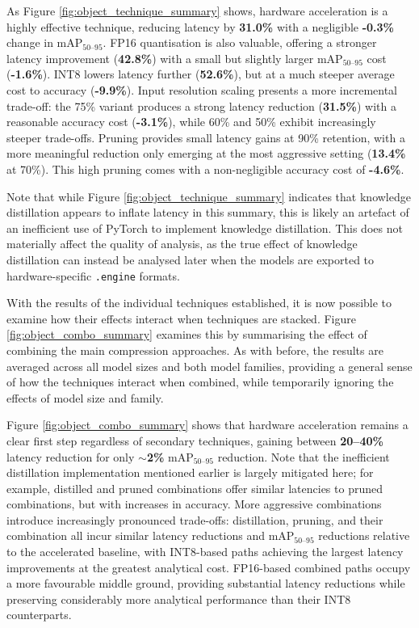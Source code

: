 

As Figure \ref{fig:object_technique_summary} shows, hardware acceleration is a highly effective technique, reducing latency by \textbf{31.0\%} with a negligible \textbf{-0.3\%} change in mAP$_{50\text{--}95}$. FP16 quantisation is also valuable, offering a stronger latency improvement (\textbf{42.8\%}) with a small but slightly larger mAP$_{50\text{--}95}$ cost (\textbf{-1.6\%}). INT8 lowers latency further (\textbf{52.6\%}), but at a much steeper average cost to accuracy (\textbf{-9.9\%}). Input resolution scaling presents a more incremental trade-off: the 75\% variant produces a strong latency reduction (\textbf{31.5\%}) with a reasonable accuracy cost (\textbf{-3.1\%}), while 60\% and 50\% exhibit increasingly steeper trade-offs. Pruning provides small latency gains at 90\% retention, with a more meaningful reduction only emerging at the most aggressive setting (\textbf{13.4\%} at 70\%). This high pruning comes with a non-negligible accuracy cost of \textbf{-4.6\%}. 

Note that while Figure \ref{fig:object_technique_summary} indicates that knowledge distillation appears to inflate latency in this summary, this is likely an artefact of an inefficient use of PyTorch to implement knowledge distillation. This does not materially affect the quality of analysis, as the true effect of knowledge distillation can instead be analysed later when the models are exported to hardware-specific \verb|.engine| formats.

With the results of the individual techniques established, it is now possible to examine how their effects interact when techniques are stacked. Figure \ref{fig:object_combo_summary} examines this by summarising the effect of combining the main compression approaches. As with before, the results are averaged across all model sizes and both model families, providing a general sense of how the techniques interact when combined, while temporarily ignoring the effects of model size and family.



Figure \ref{fig:object_combo_summary} shows that hardware acceleration remains a clear first step regardless of secondary techniques, gaining between \textbf{20--40\%} latency reduction for only \textbf{\mbox{$\sim$2\%}} mAP$_{50\text{--}95}$ reduction. Note that the inefficient distillation implementation mentioned earlier is largely mitigated here; for example, distilled and pruned combinations offer similar latencies to pruned combinations, but with increases in accuracy. More aggressive combinations introduce increasingly pronounced trade-offs: distillation, pruning, and their combination all incur similar latency reductions and mAP$_{50\text{--}95}$ reductions relative to the accelerated baseline, with INT8-based paths achieving the largest latency improvements at the greatest analytical cost. FP16-based combined paths occupy a more favourable middle ground, providing substantial latency reductions while preserving considerably more analytical performance than their INT8 counterparts.

